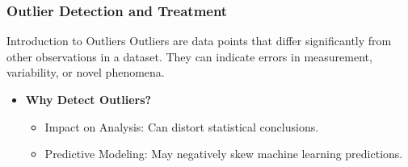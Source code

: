 \documentclass[aspectratio=169]{beamer}
\begin{document}
\begin{frame}
    \frametitle{Outlier Detection and Treatment}
    \begin{block}{Introduction to Outliers}
        Outliers are data points that differ significantly from other observations in a dataset. They can indicate errors in measurement, variability, or novel phenomena.
    \end{block}
    \begin{itemize}
        \item \textbf{Why Detect Outliers?}
        \begin{itemize}
            \item Impact on Analysis: Can distort statistical conclusions.
            \item Predictive Modeling: May negatively skew machine learning predictions.
        \end{itemize}
    \end{itemize}
\end{frame}
\end{document}
